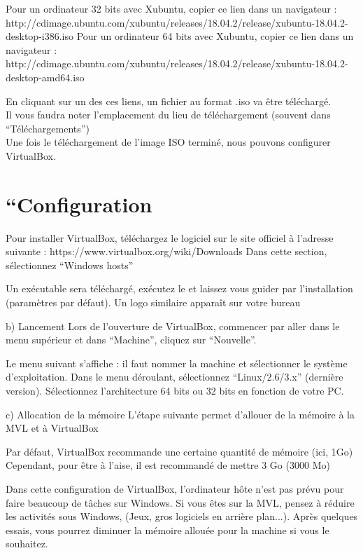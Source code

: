 Pour un ordinateur 32 bits avec Xubuntu, copier ce lien dans un navigateur : http://cdimage.ubuntu.com/xubuntu/releases/18.04.2/release/xubuntu-18.04.2-desktop-i386.iso
Pour un ordinateur 64 bits avec Xubuntu, copier ce lien dans un navigateur : http://cdimage.ubuntu.com/xubuntu/releases/18.04.2/release/xubuntu-18.04.2-desktop-amd64.iso

En cliquant sur un des ces liens, un fichier au format .iso va être téléchargé.\\
Il vous faudra noter l’emplacement du lieu de téléchargement (souvent dans “Téléchargements”)\\
Une fois le téléchargement de l’image ISO terminé, nous pouvons configurer VirtualBox.


\section{“Configuration}

Pour installer VirtualBox, téléchargez le logiciel sur le site officiel à l’adresse suivante :
https://www.virtualbox.org/wiki/Downloads 
Dans cette section, sélectionnez “Windows hosts”

Un exécutable sera téléchargé, exécutez le et laissez vous guider par l’installation (paramètres par défaut). Un logo similaire apparaît sur votre bureau




    b) Lancement
Lors de l’ouverture de VirtualBox, commencer par aller dans le menu supérieur et dans “Machine”, cliquez sur “Nouvelle”.



Le menu suivant s’affiche : il faut nommer la machine et sélectionner le système d’exploitation.
Dans le menu déroulant, sélectionnez “Linux/2.6/3.x” (dernière version).
Sélectionnez l’architecture 64 bits ou 32 bits en fonction de votre PC.


    c) Allocation de la mémoire
L’étape suivante permet d’allouer de la mémoire à la MVL et à VirtualBox



Par défaut, VirtualBox recommande une certaine quantité de mémoire (ici, 1Go)
Cependant, pour être à l’aise, il est recommandé de mettre 3 Go (3000 Mo)



Dans cette configuration de VirtualBox, l’ordinateur hôte n’est pas prévu pour faire beaucoup de tâches sur Windows. Si vous êtes sur la MVL, pensez à réduire les activités sous Windows, (Jeux, gros logiciels en arrière plan...).
Après quelques essais, vous pourrez diminuer la mémoire allouée pour la machine si vous le souhaitez.














